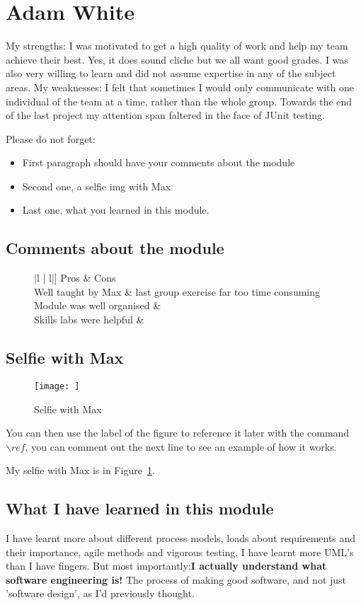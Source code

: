 \section{Adam White}
My strengths: I was motivated to get a high quality of work and help my team achieve their best. Yes, it does sound cliche but we all want good grades. I was 
also very willing to learn and did not assume expertise in any of the subject areas.
My weaknesses: I felt that sometimes I would only communicate with one individual of the team at a time, rather than the whole group. Towards the end of the last project my attention span faltered in the face of JUnit testing.

Please do not forget:
\begin{itemize}
	\item First paragraph should have your comments about the module
	\item Second one, a selfie img with Max
	\item Last one, what you learned in this module.
\end{itemize}

\subsection{Comments about the module}
\begin{figure}
	\begin{tabular}{|l | l|]}
	Pros & Cons \\ \hline
	Well taught by Max & last group exercise far too time consuming \\ \hline
	Module was well organised & \\ \hline 
	Skills labs were helpful & \\ \hline
	\end{tabular}
\end{figure}

\subsection{Selfie with Max}

\begin{figure}[h]
\caption{Selfie with Max}
\centering
\texttt{[image: ]}
\label{fig:selfie}
\end{figure}

You can then use the label of the figure to reference it later with the command ${\backslash}ref$. you can comment out the next line to see an example of how it works.

My selfie with Max is in  Figure~\ref{fig:selfie}.

\subsection{What I have learned in this module}
I have learnt more about different process models, loads about requirements and their importance, agile methods and vigorous testing. I have learnt more UML's than I have fingers. But most importantly:\textbf{I actually understand what software engineering is!} The process of making good software, and not just 'software design', as I'd previously thought. 